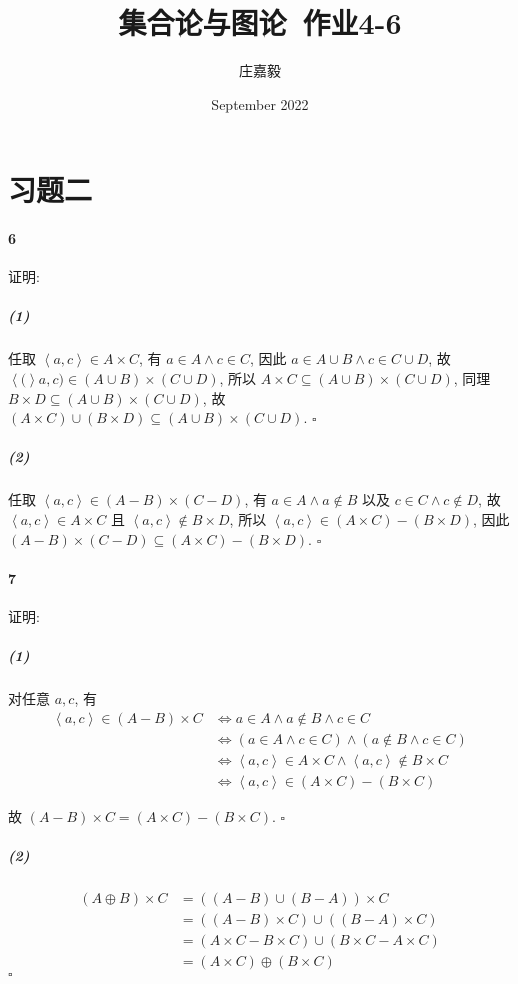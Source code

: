 \documentclass{ctexart}
\title{集合论与图论~作业4-6}
\author{庄嘉毅}
\date{September 2022}
\def\QED{\hfill $\square$}
\def\pair#1{\left\langle #1 \right\rangle}
\def\conj{\mathrel{\wedge}}
\def\equ{\mathrel{\Leftrightarrow}}
\begin{document}
\maketitle

\section*{习题二}

\paragraph*{6} 证明:

\subparagraph*{(1)} 任取 $\pair{a,c}\in A\times C$,
有 $a\in A \conj c\in C$, 因此 $a\in A\cup B \conj c\in C \cup D$,
故 $\pair(a,c)\in (A\cup B)\times (C\cup D)$, 所以
$A\times C \subseteq (A\cup B)\times (C\cup D)$, 同理
$B\times D \subseteq (A\cup B)\times (C\cup D)$, 故
$(A\times C) \cup (B\times D) \subseteq (A\cup B)\times (C\cup D)$.
\QED

\subparagraph*{(2)} 任取 $\pair{a,c} \in (A-B)\times(C-D)$, 有
$a\in A \conj a\notin B$ 以及 $c\in C \conj c\notin D$, 故
$\pair{a,c} \in A\times C$ 且 $\pair{a,c} \notin B\times D$, 所以
$\pair{a,c} \in (A\times C)-(B\times D)$, 因此
$(A-B)\times(C-D) \subseteq (A\times C)-(B\times D)$.
\QED

\paragraph*{7} 证明:

\subparagraph*{(1)} 对任意 $a, c$, 有
\begin{align*}
    \pair{a,c}\in (A-B)\times C & \equ a \in A \conj a\notin B \conj c\in C                      \\
                                & \equ (a \in A \conj c\in C) \conj (a\notin B \conj c\in C)     \\
                                & \equ \pair{a,c} \in A\times C \conj \pair{a,c}\notin B\times C \\
                                & \equ \pair{a,c} \in (A\times C)-(B\times C)
\end{align*}

故 $(A-B)\times C = (A\times C)-(B\times C)$. \QED

\subparagraph*{(2)}
\begin{align*}
    (A\oplus B)\times C & = ((A-B)\cup (B-A))\times C                       \\
                        & = ((A-B)\times C) \cup ((B-A)\times C)            \\
                        & = (A\times C-B\times C)\cup (B\times C-A\times C) \\
                        & = (A\times C)\oplus(B\times C)
\end{align*}
\QED
\end{document}
